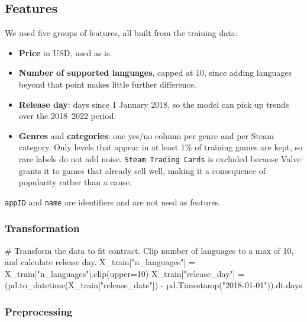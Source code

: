 \documentclass[
  letterpaper,
  DIV=11,
  numbers=noendperiod]{scrartcl}
\newenvironment{Shaded}{\begin{snugshade}}{\end{snugshade}}
\newcommand{\CommentTok}[1]{\textcolor[rgb]{0.37,0.37,0.37}{#1}}
\newcommand{\DecValTok}[1]{\textcolor[rgb]{0.68,0.00,0.00}{#1}}
\newcommand{\NormalTok}[1]{\textcolor[rgb]{0.00,0.23,0.31}{#1}}
\newcommand{\OperatorTok}[1]{\textcolor[rgb]{0.37,0.37,0.37}{#1}}
\newcommand{\StringTok}[1]{\textcolor[rgb]{0.13,0.47,0.30}{#1}}
\providecommand{\tightlist}{%
  \setlength{\itemsep}{0pt}\setlength{\parskip}{0pt}}
\begin{document}
\subsection{Features}\label{features}

We used five groups of features, all built from the training data:

\begin{itemize}
\tightlist
\item
  \textbf{Price} in USD, used as is.
\item
  \textbf{Number of supported languages}, capped at 10, since adding
  languages beyond that point makes little further difference.
\item
  \textbf{Release day}: days since 1 January 2018, so the model can pick
  up trends over the 2018--2022 period.
\item
  \textbf{Genres} and \textbf{categories}: one yes/no column per genre
  and per Steam category. Only levels that appear in at least 1\% of
  training games are kept, so rare labels do not add noise.
  \texttt{Steam\ Trading\ Cards} is excluded because Valve grants it to
  games that already sell well, making it a consequence of popularity
  rather than a cause.
\end{itemize}

\texttt{appID} and \texttt{name} are identifiers and are not used as
features.

\subsubsection{Transformation}\label{transformation}

\begin{Shaded}
\begin{Highlighting}[]
\CommentTok{\# Transform the data to fit contract. Clip number of languages to a max of 10, and calculate release day.}
\NormalTok{X\_train[}\StringTok{"n\_languages"}\NormalTok{] }\OperatorTok{=}\NormalTok{ X\_train[}\StringTok{"n\_languages"}\NormalTok{].clip(upper}\OperatorTok{=}\DecValTok{10}\NormalTok{)}
\NormalTok{X\_train[}\StringTok{"release\_day"}\NormalTok{] }\OperatorTok{=}\NormalTok{ (pd.to\_datetime(X\_train[}\StringTok{"release\_date"}\NormalTok{]) }\OperatorTok{{-}}\NormalTok{ pd.Timestamp(}\StringTok{"2018{-}01{-}01"}\NormalTok{)).dt.days}
\end{Highlighting}
\end{Shaded}

\subsubsection{Preprocessing}\label{preprocessing}
\end{document}
